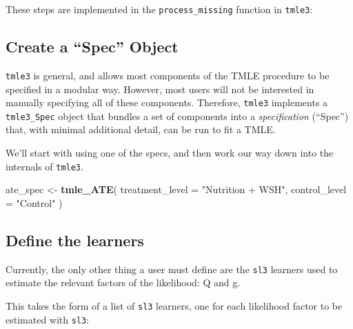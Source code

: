 \documentclass[12pt, krantz2,]{book}
\newenvironment{Shaded}{\begin{snugshade}}{\end{snugshade}}
\newcommand{\DataTypeTok}[1]{\textcolor[rgb]{0.13,0.29,0.53}{#1}}
\newcommand{\KeywordTok}[1]{\textcolor[rgb]{0.13,0.29,0.53}{\textbf{#1}}}
\newcommand{\NormalTok}[1]{#1}
\newcommand{\OperatorTok}[1]{\textcolor[rgb]{0.81,0.36,0.00}{\textbf{#1}}}
\newcommand{\StringTok}[1]{\textcolor[rgb]{0.31,0.60,0.02}{#1}}
\theoremstyle{definition}
\theoremstyle{definition}
\theoremstyle{definition}
\newcommand{\1}{\mathbbm{1}}
\begin{document}
These steps are implemented in the \texttt{process\_missing} function in \texttt{tmle3}:

\begin{Shaded}
\end{Shaded}

\hypertarget{create-a-spec-object}{%
\subsection{Create a ``Spec'' Object}\label{create-a-spec-object}}

\texttt{tmle3} is general, and allows most components of the TMLE procedure to be
specified in a modular way. However, most users will not be interested in
manually specifying all of these components. Therefore, \texttt{tmle3} implements a
\texttt{tmle3\_Spec} object that bundles a set of components into a \emph{specification}
(``Spec'') that, with minimal additional detail, can be run to fit a TMLE.

We'll start with using one of the specs, and then work our way down into the
internals of \texttt{tmle3}.

\begin{Shaded}
\begin{Highlighting}[]
\NormalTok{ate_spec <-}\StringTok{ }\KeywordTok{tmle_ATE}\NormalTok{(}
  \DataTypeTok{treatment_level =} \StringTok{"Nutrition + WSH"}\NormalTok{,}
  \DataTypeTok{control_level =} \StringTok{"Control"}
\NormalTok{)}
\end{Highlighting}
\end{Shaded}

\hypertarget{define-the-learners}{%
\subsection{Define the learners}\label{define-the-learners}}

Currently, the only other thing a user must define are the \texttt{sl3} learners used
to estimate the relevant factors of the likelihood: Q and g.

This takes the form of a list of \texttt{sl3} learners, one for each likelihood factor
to be estimated with \texttt{sl3}:
\end{document}
